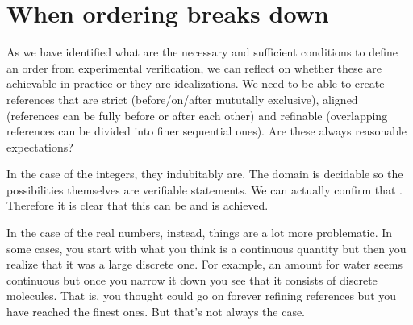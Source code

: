 \documentclass[11pt,letterpaper,fleqn]{memoir} %
\begin{document}
\section{When ordering breaks down}

As we have identified what are the necessary and sufficient conditions to define an order from experimental verification, we can reflect on whether these are achievable in practice or they are idealizations. We need to be able to create references that are strict (before/on/after mututally exclusive), aligned (references can be fully before or after each other) and refinable (overlapping references can be divided into finer sequential ones). Are these always reasonable expectations?

In the case of the integers, they indubitably are. The domain is decidable so the possibilities themselves are verifiable statements. We can actually confirm that . Therefore it is clear that this can be and is achieved.

In the case of the real numbers, instead, things are a lot more problematic. In some cases, you start with what you think is a continuous quantity but then you realize that it was a large discrete one. For example, an amount for water seems continuous but once you narrow it down you see that it consists of discrete molecules. That is, you thought could go on forever refining references but you have reached the finest ones. But that's not always the case.
\end{document}

